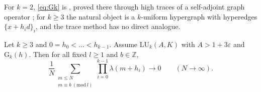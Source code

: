 For $k=2$, \eqref{eq:Gk} is \cite[Proposition~10.1]{OpenAI2026}, proved there through high traces of a self-adjoint graph operator \cite[\S\S13--17, pp.~55--81]{OpenAI2026}; for $k\ge3$ the natural object is a $k$-uniform hypergraph with hyperedges $\{x+h_id\}_i$, and the trace method has no direct analogue.

\begin{theorem}
\label{thm:conditional_k}
Let $k\ge3$ and $0=h_0<\dots<h_{k-1}$. Assume $\mathrm{LU}_k(A,K)$ with $A>1+3\varepsilon$ and $\mathrm{G}_k(h)$. Then for all fixed $l\ge1$ and $b\in\mathbb Z$,
\begin{equation}
\frac1N\sum_{\substack{m\le N\\ m\equiv b\ (\mathrm{mod}\ l)}}\prod_{i=0}^{k-1}\lambda(m+h_i)\longrightarrow0\qquad(N\to\infty).
\label{eq:conditional_k}
\end{equation}
\end{theorem}

